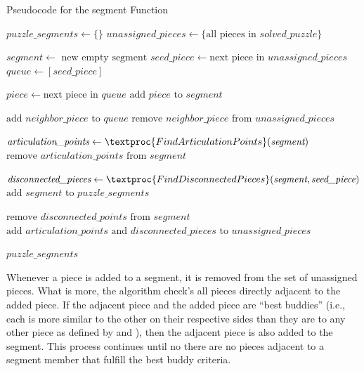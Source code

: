 \begin{algorithm}
\caption{Pseudocode for the segment Function}\label{alg:segmentPuzzle}
\begin{algorithmic}[1]
    \State $puzzle\_segments \gets \{ \}$
    \State $unassigned\_pieces \gets \{ \text{all pieces in } solved\_puzzle \}$
\item[]
        \State $segment \gets \text{ new empty segment}$
        \State $seed\_piece \gets \text{next piece in } unassigned\_pieces$
        \State $queue \gets [seed\_piece]$
\item[]
            \State $piece \gets \text{next piece in } queue$
            \State $\text{add } piece \text{ to } segment$
\item[]
            		\State $\text{add } neighbor\_piece \text{ to } \textit{queue}$
            		\State $\text{remove } neighbor\_piece \text{ from } unassigned\_pieces$
            	\EndIf
            \EndFor
        \EndWhile
\item[]
        \State $\textit{articulation\_points} \gets \textproc{FindArticulationPoints}(\textit{segment})$
        \State $\text{remove } \textit{articulation\_points} \text{ from } \textit{segment}$
\item[]
		\State $\textit{disconnected\_pieces} \gets \textproc{FindDisconnectedPieces}(\textit{segment},\textit{seed\_piece})$        
        \State $\text{add } segment \text{ to } puzzle\_segments$
\item[]
		\State $\text{remove } \textit{disconnected\_points} \text{ from } \textit{segment}$
        \State $\text{add } \textit{articulation\_points} \text{ and } \textit{disconnected\_pieces} \text{ to } \textit{unassigned\_pieces}$
    \EndWhile
\item[]
    \State \Return $\textit{puzzle\_segments}$
\EndFunction
\end{algorithmic}
\end{algorithm}

Whenever a piece is added to a segment, it is removed from the set of unassigned pieces. What is more, the algorithm check's all pieces directly adjacent to the added piece.  If the adjacent piece and the added piece are ``best buddies'' (i.e., each is more similar to the other on their respective sides than they are to any other piece as defined by \cite{pomeranz2011} and \cite{paikin2015}), then the adjacent piece is also added to the segment.  This process continues until no there are no pieces adjacent to a segment member that fulfill the best buddy criteria.

